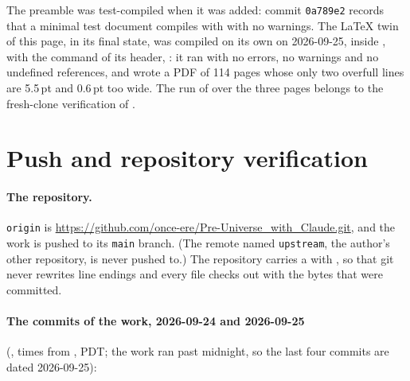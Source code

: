 The preamble was test-compiled when it was added: commit \texttt{0a789e2} records that a minimal test
document compiles with  with no warnings. The LaTeX twin of this page, in its final
state, was compiled on its own on 2026-09-25, inside , with the command of its
header,
:
it ran with no errors, no warnings and no undefined references, and wrote a PDF of 114 pages
whose only two overfull lines are 5.5\,pt and 0.6\,pt too wide. The run of  over the three pages belongs to the fresh-clone
verification of .

\section{Push and repository verification}
\label{sec:12}

\paragraph{The repository.} \texttt{origin} is \url{https://github.com/once-ere/Pre-Universe_with_Claude.git},
and the work is pushed to its \texttt{main} branch. (The remote named \texttt{upstream}, the author's
other repository, is never pushed to.) The repository carries a  with
, so that git never rewrites line endings and every file checks out with the bytes that
were committed.

\paragraph{The commits of the work, 2026-09-24 and 2026-09-25} (, times
from , PDT; the work ran past midnight, so the last four commits are dated
2026-09-25):

